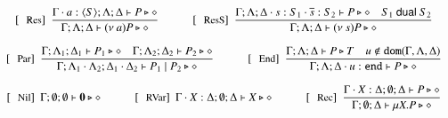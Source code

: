 \begin{figure}[!t]
\[\begin{array}{c}
		\trule{Res}~~\tree{
			\Gamma\cat a:\chtype{S} ; \Lambda; \Delta \proves P \hastype \Proc
		}{
			\Gamma; \Lambda; \Delta \proves \news{a} P \hastype \Proc}
		\qquad\quad
		\trule{ResS}~~\tree{
			\Gamma; \Lambda; \Delta \cat s:S_1 \cat \dual{s}: S_2 \proves P \hastype \Proc \quad S_1 \dualof S_2
		}{
			\Gamma; \Lambda; \Delta \proves \news{s} P \hastype \Proc
		}
		\\[6mm]

		\trule{Par}~~\tree{
			\Gamma; \Lambda_{1}; \Delta_{1} \proves P_{1} \hastype \Proc \quad \Gamma; \Lambda_{2}; \Delta_{2} \proves P_{2} \hastype \Proc
		}{
			\Gamma; \Lambda_{1} \cat \Lambda_2; \Delta_{1} \cat \Delta_2 \proves P_1 \Par P_2 \hastype \Proc
		}
		\qquad\quad
		\trule{End}~~\tree{
			\Gamma; \Lambda; \Delta  \proves P \hastype T \quad u \not\in \dom{\Gamma, \Lambda,\Delta}
		}{
			\Gamma; \Lambda; \Delta \cat u: \tinact  \proves P \hastype \Proc
		}
		\\[6mm]

		\trule{Nil}~~\Gamma; \emptyset; \emptyset \proves \inact \hastype \Proc
		\qquad \quad
		\trule{RVar}~~\Gamma \cat \varp{X}: \Delta; \emptyset; \Delta  \proves \varp{X} \hastype \Proc
		\qquad\quad 

	 	\trule{Rec}~~\tree{
			\Gamma \cat \varp{X}: \Delta; \emptyset; \Delta  \proves P \hastype \Proc
		}{
			\Gamma ; \emptyset; \Delta  \proves \recp{X}{P} \hastype \Proc
		}



\end{array}\]
\end{figure}
